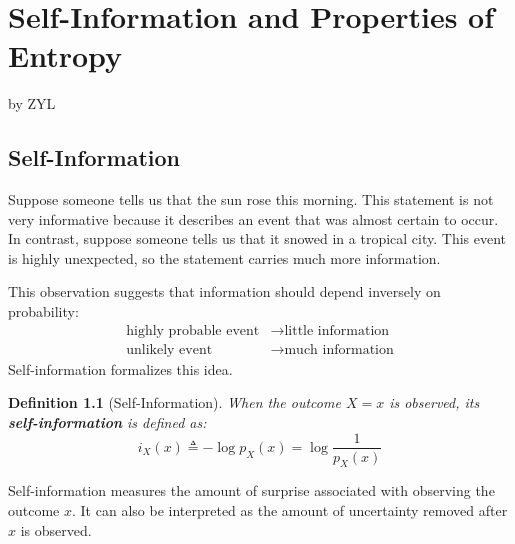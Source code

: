 \documentclass[11pt]{report}
\theoremstyle{lecturedefinition}
\newtheorem{definition}{Definition}
\theoremstyle{lectureremark}
\begin{document}
\setcounter{chapter}{1}
\chapter{Self-Information and Properties of Entropy}
\begin{center}
by ZYL
\end{center}
\section{Self-Information}
Suppose someone tells us that the sun rose this morning. This statement is not very informative because it describes an event that was almost certain to occur. In contrast, suppose someone tells us that it snowed in a tropical city. This event is highly unexpected, so the statement carries much more information.

This observation suggests that information should depend inversely on probability:
\begin{equation*}
    \begin{aligned}
        \text{highly probable event}&\rightarrow \text{little information}\\
        \text{unlikely event}&\rightarrow\text{much information}
    \end{aligned}
\end{equation*}
Self-information formalizes this idea.

\begin{definition}[Self-Information]
When the outcome $X=x$ is observed, its \textbf{self-information} is defined as:
\begin{equation*}
    i_X(x)\triangleq-\log p_X(x)=\log\frac{1}{p_X(x)}
\end{equation*}
\end{definition}
Self-information measures the amount of surprise associated with observing the outcome $x$. It can also be interpreted as the amount of uncertainty removed after $x$ is observed.
\end{document}
